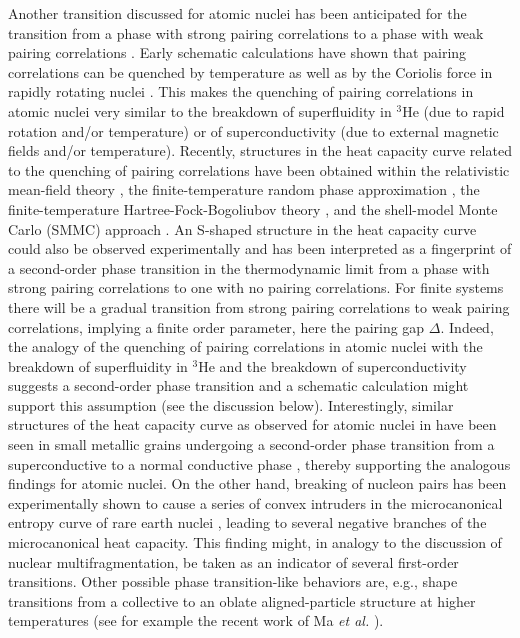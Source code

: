 \documentclass[rmp,aps,floatfix]{revtex4}
\begin{document}
Another transition discussed for atomic nuclei has been anticipated 
for the transition from a phase with strong pairing correlations to a phase 
with weak pairing correlations \cite{SY63}. Early schematic calculations have 
shown that pairing correlations can be quenched by temperature as well as by 
the Coriolis force in rapidly 
rotating nuclei \cite{Go81a,Go81b,TS80,TS82,shimizu89}. 
This makes the quenching of pairing correlations in atomic nuclei very similar 
to the breakdown of superfluidity in $^3$He (due to rapid rotation and/or 
temperature) or of superconductivity (due to external magnetic fields and/or 
temperature). Recently, structures in the heat capacity curve related to the 
quenching of pairing correlations have been obtained within the relativistic 
mean-field theory \cite{AT00,AT01}, the finite-temperature random phase 
approximation \cite{Ng90}, the finite-temperature Hartree-Fock-Bogoliubov 
theory \cite{ER00}, and the shell-model Monte Carlo (SMMC) approach 
\cite{DK95a,NA97,RH98,WK00,liu01}. An S-shaped structure in the heat capacity 
curve could also be observed experimentally \cite{schiller2001} and has been 
interpreted as a fingerprint of a second-order phase 
transition in the thermodynamic limit from a phase 
with strong pairing correlations to one with no pairing correlations. For finite systems
there will be a gradual transition from strong pairing correlations to weak pairing 
correlations, implying a finite order parameter, here the pairing gap $\Delta$.
Indeed, the analogy of the quenching of pairing correlations in atomic nuclei 
with the breakdown of superfluidity in $^3$He and the breakdown of 
superconductivity suggests a second-order phase transition and a schematic 
calculation might support this assumption (see the discussion below). 
Interestingly, similar 
structures of the heat capacity curve as observed for atomic nuclei in 
\cite{schiller2001} have been seen in 
small metallic grains undergoing a second-order 
phase transition from a superconductive to a normal conductive phase 
\cite{tinkham95,tinkham96,tinkham98,delft2000,LA93}, thereby supporting the analogous findings for atomic nuclei. On 
the other hand, breaking of nucleon pairs has been experimentally shown to 
cause a series of convex intruders in the microcanonical entropy curve of rare 
earth nuclei \cite{oslo3,MG01}, leading to several negative branches of the 
microcanonical heat capacity. 
This finding might, in analogy to the discussion 
of nuclear multifragmentation, be taken as an indicator of several first-order
transitions.
Other possible phase transition-like behaviors are, e.g., shape transitions
from a collective to an oblate aligned-particle structure 
at higher temperatures (see for example the recent work of Ma {\em et al.}
\cite{tenglek2000}).
\end{document}
